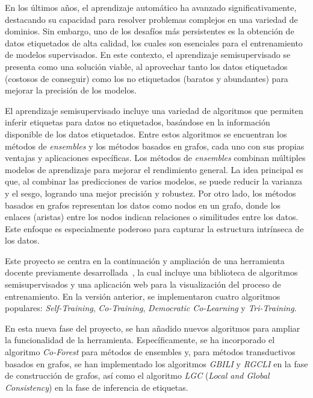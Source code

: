 
En los últimos años, el aprendizaje automático ha avanzado significativamente, destacando su capacidad para resolver problemas complejos en una variedad de dominios. Sin embargo, uno de los desafíos más persistentes es la obtención de datos etiquetados de alta calidad, los cuales son esenciales para el entrenamiento de modelos supervisados. En este contexto, el aprendizaje semisupervisado se presenta como una solución viable, al aprovechar tanto los datos etiquetados (costosos de conseguir) como los no etiquetados (baratos y abundantes) para mejorar la precisión de los modelos.

El aprendizaje semisupervisado incluye una variedad de algoritmos que permiten inferir etiquetas para datos no etiquetados, basándose en la información disponible de los datos etiquetados. Entre estos algoritmos se encuentran los métodos de \textit{ensembles} y los métodos basados en grafos, cada uno con sus propias ventajas y aplicaciones específicas. Los métodos de \textit{ensembles} combinan múltiples modelos de aprendizaje para mejorar el rendimiento general. La idea principal es que, al combinar las predicciones de varios modelos, se puede reducir la varianza y el sesgo, logrando una mejor precisión y robustez. Por otro lado, los métodos basados en grafos representan los datos como nodos en un grafo, donde los enlaces (aristas) entre los nodos indican relaciones o similitudes entre los datos. Este enfoque es especialmente poderoso para capturar la estructura intrínseca de los datos.

Este proyecto se centra en la continuación y ampliación de una herramienta docente previamente desarrollada~\cite{TFG:David}, la cual incluye una biblioteca de algoritmos semisupervisados y una aplicación web para la visualización del proceso de entrenamiento. En la versión anterior, se implementaron cuatro algoritmos populares: \textit{Self-Training}, \textit{Co-Training}, \textit{Democratic Co-Learning} y \textit{Tri-Training}.

En esta nueva fase del proyecto, se han añadido nuevos algoritmos para ampliar la funcionalidad de la herramienta. Específicamente, se ha incorporado el algoritmo \textit{Co-Forest} para métodos de ensembles y, para métodos transductivos basados en grafos, se han implementado los algoritmos \textit{GBILI} y \textit{RGCLI} en la fase de construcción de grafos, así como el algoritmo \textit{LGC} (\textit{Local and Global Consistency}) en la fase de inferencia de etiquetas.

